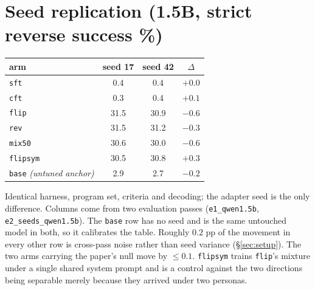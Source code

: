 \documentclass{article}
\newcommand{\arm}[1]{\texttt{#1}}
\begin{document}
\section{Seed replication (1.5B, strict reverse success \%)}
\label{app:seeds}
\begin{center}\small
\begin{tabular}{lccc}
\toprule
arm & seed 17 & seed 42 & $\Delta$ \\
\midrule
\arm{sft}     & 0.4 & 0.4 & $+0.0$ \\
\arm{cft}     & 0.3 & 0.4 & $+0.1$ \\
\midrule
\arm{flip}    & 31.5 & 30.9 & $-0.6$ \\
\arm{rev}     & 31.5 & 31.2 & $-0.3$ \\
\arm{mix50}   & 30.6 & 30.0 & $-0.6$ \\
\arm{flipsym} & 30.5 & 30.8 & $+0.3$ \\
\midrule
\arm{base} \emph{(untuned anchor)} & 2.9 & 2.7 & $-0.2$ \\
\bottomrule
\end{tabular}
\end{center}
Identical harness, program set, criteria and decoding; the adapter seed is the only
difference. Columns come from two evaluation passes
(\texttt{e1\_qwen1.5b}, \texttt{e2\_seeds\_qwen1.5b}). The \arm{base} row has no seed and
is the same untouched model in both, so it calibrates the table. Roughly $0.2$ pp of the
movement in every other row is cross-pass noise rather than seed variance
(\S\ref{sec:setup}).
The two arms carrying the paper's null move by $\leq0.1$. \arm{flipsym} trains \arm{flip}'s
mixture under a single shared system prompt and is a control against the two directions
being separable merely because they arrived under two personas.
\end{document}
